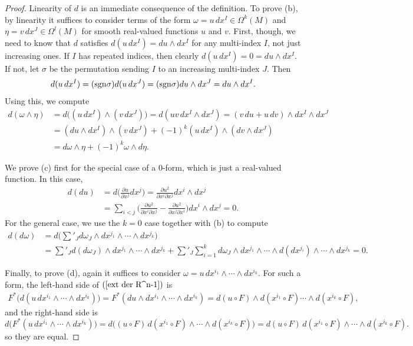 \begin{proof}
Linearity of $d$ is an immediate consequence of the definition. To prove (b), by linearity it suffices to consider terms of the form $\omega=u\,dx^I\in\Omega^k(M)$ and $\eta=v\,dx^J\in\Omega^l(M)$ for smooth real-valued functions $u$ and $v$. First, though, we need to know that $d$ satisfies $d(u\,dx^I)=du\wedge dx^I$ for any multi-index $I$, not just increasing ones. If $I$ has repeated indices, then clearly $d(u\,dx^I)=0=du\wedge dx^I$. If not, let $\sigma$ be the permutation sending $I$ to an increasing multi-index $J$. Then
\[d(u\,dx^I)=(\mathrm{sgn}\sigma)d(u\,dx^J)=(\mathrm{sgn}\sigma)du\wedge dx^J=du\wedge dx^I.\]
Using this, we compute
\begin{align*}
d(\omega\wedge\eta)&=d\big((u\,dx^I)\wedge(v\,dx^J)\big)=d(uv\,dx^I\wedge dx^J)=(v\,du+u\,dv)\wedge dx^I\wedge dx^J\\
&=(du\wedge dx^I)\wedge(v\,dx^J)+(-1)^k(u\,dx^I)\wedge(dv\wedge dx^J)\\
&=d\omega\wedge\eta+(-1)^k\omega\wedge d\eta.
\end{align*}

We prove (c) first for the special case of a $0$-form, which is just a real-valued function. In this case,
\begin{align*}
d(du)&=d\Big(\frac{\partial u}{\partial x^j}dx^j\Big)=\frac{\partial u^2}{\partial x^i\partial x^j}dx^i\wedge dx^j\\
&=\sum_{i<j}\Big(\frac{\partial u^2}{\partial x^i\partial x^j}-\frac{\partial u^2}{\partial x^j\partial x^i}\Big)dx^i\wedge dx^j=0.
\end{align*}
For the general case, we use the $k=0$ case together with (b) to compute
\begin{align*}
d(d\omega)&=d\Big(\sum'_{J}d\omega_J\wedge dx^{j_1}\wedge\cdots\wedge dx^{j_k}\Big)\\
&=\sum'_Jd(d\omega_J)\wedge dx^{j_1}\wedge\cdots\wedge dx^{j_k}+\sum'_J\sum_{i=1}^{k}d\omega_J\wedge dx^{j_1}\wedge\cdots\wedge d(dx^{j_i})\wedge\cdots\wedge dx^{j_k}=0.
\end{align*}

Finally, to prove (d), again it suffices to consider $\omega=u\,dx^{i_1}\wedge\cdots\wedge dx^{i_k}$. For such a form, the left-hand side of $(\ref{ext der R^n-1})$ is
\begin{align*}
F^*\big(d(u\,dx^{i_1}\wedge\cdots\wedge dx^{i_k})\big)=F^*(du\wedge dx^{i_1}\wedge\cdots\wedge dx^{i_k})=d(u\circ F)\wedge d(x^{i_1}\circ F)\cdots\wedge d(x^{i_k}\circ F),
\end{align*}
and the right-hand side is
\[d\big(F^*(u\,dx^{i_1}\wedge\cdots\wedge dx^{i_k})\big)=d\big((u\circ F)\,d(x^{i_1}\circ F)\wedge\cdots\wedge d(x^{i_k}\circ F)\big)=d(u\circ F)\,d(x^{i_1}\circ F)\wedge\cdots\wedge d(x^{i_k}\circ F).\]
so they are equal.
\end{proof}
